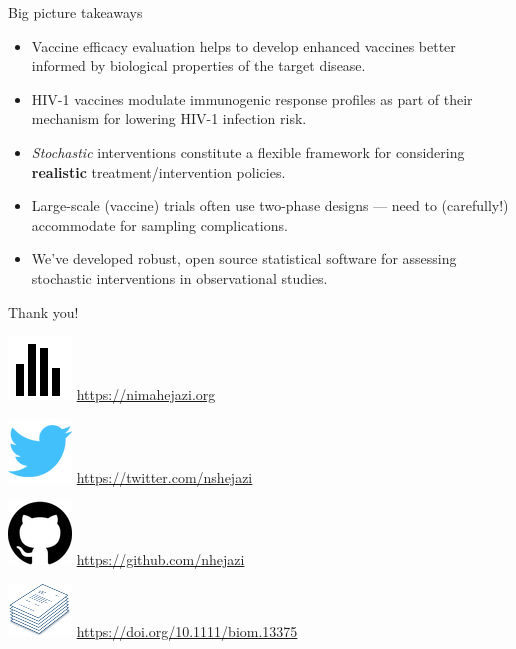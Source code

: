 \documentclass{beamer}
\begin{document}

\begin{frame}[c]{Big picture takeaways}

\begin{center}
\begin{itemize}
  \itemsep8pt
  \item Vaccine efficacy evaluation helps to develop enhanced vaccines better
    informed by biological properties of the target disease.
  \item HIV-1 vaccines modulate immunogenic response profiles as part of their
    mechanism for lowering HIV-1 infection risk.
  \item \textit{Stochastic} interventions constitute a flexible framework for
    considering \textbf{realistic} treatment/intervention policies.
  \item Large-scale (vaccine) trials often use two-phase designs --- need to
    (carefully!) accommodate for sampling complications.
  \item We've developed robust, open source statistical software for assessing
    stochastic interventions in observational studies.
\end{itemize}
\end{center}

\note{
}

\end{frame}


\begin{frame}[c]{Thank you!}

\includegraphics[scale=0.14]{homepage.png} \url{https://nimahejazi.org}

\vspace{2mm}
\includegraphics[scale=0.14]{twitter-icon.png}
  \url{https://twitter.com/nshejazi}

\vspace{2mm}
\includegraphics[scale=0.11]{github-icon.png}
  \url{https://github.com/nhejazi}

\vspace{2mm}
\includegraphics[scale=0.14]{paper-icon.png}
  \url{https://doi.org/10.1111/biom.13375}

\end{frame}
\end{document}
